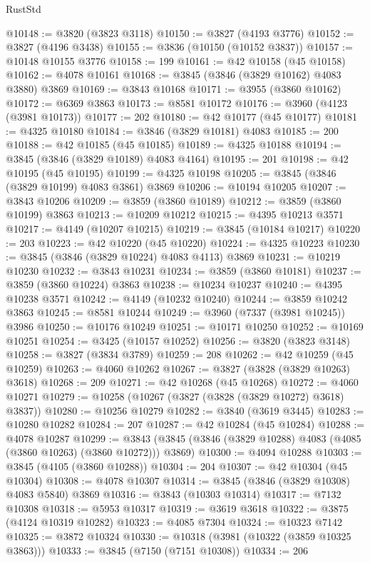 \begin{lexlean}{RustStd}
\begin{coremodule}
@10148 := @3820 (@3823 @3118)
@10150 := @3827 (@4193 @3776)
@10152 := @3827 (@4196 @3438)
@10155 := @3836 (@10150 (@10152 @3837))
@10157 := @10148 @10155 @3776
@10158 := 199
@10161 := @42 @10158 (@45 @10158)
@10162 := @4078 @10161
@10168 := @3845 (@3846 (@3829 @10162) @4083 @3880) @3869
@10169 := @3843 @10168
@10171 := @3955 (@3860 @10162)
@10172 := @6369 @3863
@10173 := @8581 @10172
@10176 := @3960 (@4123 (@3981 @10173))
@10177 := 202
@10180 := @42 @10177 (@45 @10177)
@10181 := @4325 @10180
@10184 := @3846 (@3829 @10181) @4083
@10185 := 200
@10188 := @42 @10185 (@45 @10185)
@10189 := @4325 @10188
@10194 := @3845 (@3846 (@3829 @10189) @4083 @4164)
@10195 := 201
@10198 := @42 @10195 (@45 @10195)
@10199 := @4325 @10198
@10205 := @3845 (@3846 (@3829 @10199) @4083 @3861) @3869
@10206 := @10194 @10205
@10207 := @3843 @10206
@10209 := @3859 (@3860 @10189)
@10212 := @3859 (@3860 @10199) @3863
@10213 := @10209 @10212
@10215 := @4395 @10213 @3571
@10217 := @4149 (@10207 @10215)
@10219 := @3845 (@10184 @10217)
@10220 := 203
@10223 := @42 @10220 (@45 @10220)
@10224 := @4325 @10223
@10230 := @3845 (@3846 (@3829 @10224) @4083 @4113) @3869
@10231 := @10219 @10230
@10232 := @3843 @10231
@10234 := @3859 (@3860 @10181)
@10237 := @3859 (@3860 @10224) @3863
@10238 := @10234 @10237
@10240 := @4395 @10238 @3571
@10242 := @4149 (@10232 @10240)
@10244 := @3859 @10242 @3863
@10245 := @8581 @10244
@10249 := @3960 (@7337 (@3981 @10245)) @3986
@10250 := @10176 @10249
@10251 := @10171 @10250
@10252 := @10169 @10251
@10254 := @3425 (@10157 @10252)
@10256 := @3820 (@3823 @3148)
@10258 := @3827 (@3834 @3789)
@10259 := 208
@10262 := @42 @10259 (@45 @10259)
@10263 := @4060 @10262
@10267 := @3827 (@3828 (@3829 @10263) @3618)
@10268 := 209
@10271 := @42 @10268 (@45 @10268)
@10272 := @4060 @10271
@10279 := @10258 (@10267 (@3827 (@3828 (@3829 @10272) @3618) @3837))
@10280 := @10256 @10279
@10282 := @3840 (@3619 @3445)
@10283 := @10280 @10282
@10284 := 207
@10287 := @42 @10284 (@45 @10284)
@10288 := @4078 @10287
@10299 := @3843 (@3845 (@3846 (@3829 @10288) @4083 (@4085 (@3860 @10263) (@3860 @10272))) @3869)
@10300 := @4094 @10288
@10303 := @3845 (@4105 (@3860 @10288))
@10304 := 204
@10307 := @42 @10304 (@45 @10304)
@10308 := @4078 @10307
@10314 := @3845 (@3846 (@3829 @10308) @4083 @5840) @3869
@10316 := @3843 (@10303 @10314)
@10317 := @7132 @10308
@10318 := @5953 @10317
@10319 := @3619 @3618
@10322 := @3875 (@4124 @10319 @10282)
@10323 := @4085 @7304
@10324 := @10323 @7142
@10325 := @3872 @10324
@10330 := @10318 (@3981 (@10322 (@3859 @10325 @3863)))
@10333 := @3845 (@7150 (@7151 @10308))
@10334 := 206

\end{coremodule}
\end{lexlean}
